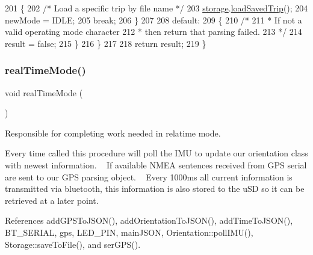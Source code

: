 \begin{DoxyCode}
201     \{
202       \textcolor{comment}{/* Load a specific trip by file name */}
203       \hyperlink{logging-device_8ino_a40059244119c00baa1b841119cfd1b2e}{storage}.\hyperlink{class_storage_af56ca8289ed925300e3385114c561eec}{loadSavedTrip}();
204       newMode = IDLE;
205       \textcolor{keywordflow}{break};
206     \}
207 
208     \textcolor{keywordflow}{default}:
209     \{
210       \textcolor{comment}{/*}
211 \textcolor{comment}{       * If not a valid operating mode character}
212 \textcolor{comment}{       * then return that parsing failed.}
213 \textcolor{comment}{       */}
214       result = \textcolor{keyword}{false};
215     \}
216   \}
217 
218   \textcolor{keywordflow}{return} result;
219 \}
\end{DoxyCode}
\mbox{\label{logging-device_8ino_ab4c1c4c0fa047e336f9f4176406a54f1}} 
\subsubsection{\texorpdfstring{real\+Time\+Mode()}{realTimeMode()}}
{\footnotesize\ttfamily void real\+Time\+Mode (\begin{DoxyParamCaption}{ }\end{DoxyParamCaption})}



Responsible for completing work needed in relatime mode. 

Every time called this procedure will poll the I\+MU to update our orientation class with newest information. ~\newline
If available N\+M\+EA sentences received from G\+PS serial are sent to our G\+PS parsing object. ~\newline
 Every 1000ms all current information is transmitted via bluetooth, this information is also stored to the u\+SD so it can be retrieved at a later point. 

References add\+G\+P\+S\+To\+J\+S\+O\+N(), add\+Orientation\+To\+J\+S\+O\+N(), add\+Time\+To\+J\+S\+O\+N(), B\+T\+\_\+\+S\+E\+R\+I\+AL, gps, L\+E\+D\+\_\+\+P\+IN, main\+J\+S\+ON, Orientation\+::poll\+I\+M\+U(), Storage\+::save\+To\+File(), and ser\+G\+P\+S().


